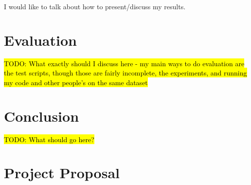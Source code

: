 \documentclass[12pt,a4paper,twoside,openright]{report}
\newcommand{\todo}[1]{\hl{TODO: #1}}
\begin{document}
	I would like to talk about how to present/discuss my results.
	
	\chapter{Evaluation}
	\todo{What exactly should I discuss here - my main ways to do evaluation are the test scripts,  though those are fairly incomplete, the experiments, and running my code and other people's on the same dataset}
	
	\chapter{Conclusion}
	
\todo{What should go here?}
	
	
	\appendix

	\chapter{Project Proposal}
	

	
\end{document}
